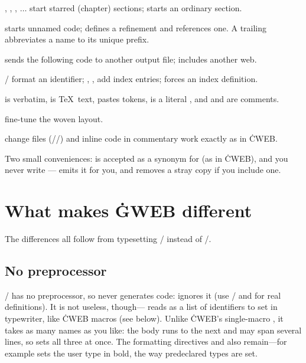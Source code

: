\bull {}, , , $\ldots$ start starred (chapter) sections;
 starts an ordinary section.

\bull {} starts unnamed code;  defines a refinement and
 references one. A trailing  abbreviates a name to its
unique prefix.

\bull {} sends the following code to another output file; 
includes another web.

\bull {}/ format an identifier; , ,
 add index entries;  forces an index definition.

\bull {} is verbatim,  is \TeX\ text,  pastes
tokens,  is a literal , and  and  are
comments.

\bull {}    fine-tune the woven layout.

\bull change files (//) and inline code  in
commentary work exactly as in \.{CWEB}.

\noindent Two small conveniences:  is accepted as a synonym for 
(as in \.{CWEB}), and you never write --- emits it
for you, and removes a stray copy if you include one.

\chapter{What makes \.{GWEB} different}
\noindent The differences all follow from typesetting \GO/ instead of \CEE/.

\section{No preprocessor}
\GO/ has no preprocessor, so  never generates code:  ignores it
(use \GO/  and  for real definitions). It is not useless,
though--- reads  as a list of identifiers to set in
typewriter, like \.{CWEB} macros (see below). Unlike \.{CWEB}'s single-macro
, it takes as many names as you like: the body runs to the next  and
may span several lines, so  sets all three at once. The
formatting directives  and  also remain---for example
 sets the user type  in bold, the way predeclared
types are set.


